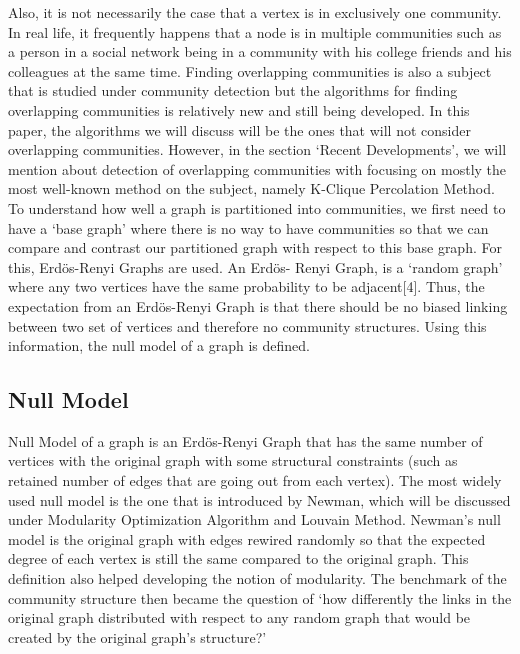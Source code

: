 \documentclass[10pt]{article}
\begin{document}
Also, it is not necessarily the case that a vertex is in exclusively one community. In real life, it frequently happens that a node is in multiple communities such as a person in a social network being in a community with his college friends and his colleagues at the same time. Finding overlapping communities is also a subject that is studied under community detection but the algorithms for finding overlapping communities is relatively new and still being developed. In this paper, the algorithms we will discuss will be the ones that will not consider overlapping communities. However, in the section ‘Recent Developments’, we will mention about detection of overlapping communities with focusing on mostly the most well-known method on the subject, namely K-Clique Percolation Method. \\

To understand how well a graph is partitioned into communities, we first need to have a ‘base graph’ where there is no way to have communities so that we can compare and contrast our partitioned graph with respect to this base graph. For this, Erdös-Renyi Graphs are used. An Erdös- Renyi Graph, is a ‘random graph’ where any two vertices have the same probability to be adjacent[4]. Thus, the expectation from an Erdös-Renyi Graph is that there should be no biased linking between two set of vertices and therefore no community structures. Using this information, the null model of a graph is defined. \\

\subsection{Null Model} 

Null Model of a graph is an Erdös-Renyi Graph that has the same number of vertices with the original graph with some structural constraints (such as retained number of edges that are going out from each vertex). The most widely used null model is the one that is introduced by Newman, which will be discussed under Modularity Optimization Algorithm and Louvain Method.
Newman’s null model is the original graph with edges rewired randomly so that the expected degree of each vertex is still the same compared to the original graph. This definition also helped developing the notion of modularity. The benchmark of the community structure then became the question of ‘how differently the links in the original graph distributed with respect to any random graph that would be created by the original graph’s structure?’ \\
\end{document}
